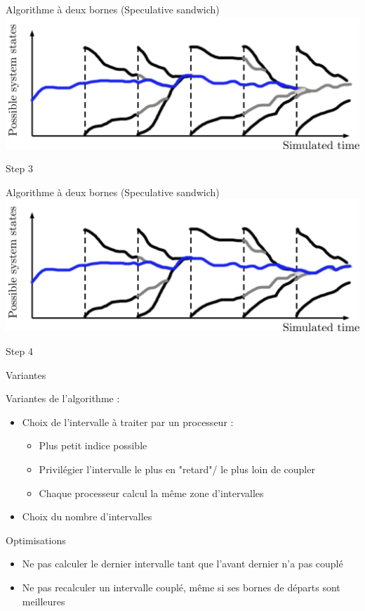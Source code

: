 \documentclass[10pt,usenames,dvipsnames]{beamer}
\begin{document}
\begin{frame}{Algorithme à deux bornes (Speculative sandwich)}
  \centering
	   \includegraphics [width=\textwidth]{step2} 
	   
	   Step 3
\end{frame}
\begin{frame}{Algorithme à deux bornes (Speculative sandwich)}
  \centering
	   \includegraphics [width=\textwidth]{step3} 
	   
	   Step 4
\end{frame}

\begin{frame}{Variantes }

Variantes de l'algorithme :
 \begin{itemize}
 \item Choix de l'intervalle à traiter par un processeur :
 \begin{itemize}
 \item Plus petit indice possible
 \item Privilégier l'intervalle le plus en "retard"/ le plus loin de coupler
 \item Chaque processeur calcul la même zone d'intervalles
 \end{itemize}
 \item Choix du nombre d'intervalles
 \end{itemize}
 \vspace{1cm}
 Optimisations
   \begin{itemize}
 \item Ne pas calculer le dernier intervalle tant que l'avant dernier n'a pas couplé
 \item Ne pas recalculer un intervalle couplé, même si ses bornes de départs sont meilleures
  \end{itemize}
\end{frame}
\end{document}
